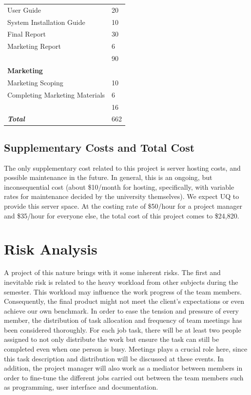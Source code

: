 \documentclass[12pt]{article}
\begin{document}
\begin{longtable}{|l|l|}
    User Guide                           & 20            \\
    System Installation Guide            & 10            \\
    Final Report                         & 30            \\
    Marketing Report                     & 6             \\
    \hline
    ~                                    & 90            \\
    \hline
    {\bf Marketing}                      & ~             \\
    Marketing Scoping                    & 10            \\
    Completing Marketing Materials       & 6             \\
    \hline
    ~                                    & 16            \\
    \hline\hline
    {\bf \em Total}                      & 662           \\
    \hline
\end{longtable}

\subsection*{Supplementary Costs and Total Cost}

The only supplementary cost related to this project is server hosting costs, and possible maintenance in the future. In general, this is an ongoing, but inconsequential cost (about \$10/month for hosting, specifically, with variable rates for maintenance decided by the university themselves). We expect UQ to provide this server space. At the costing rate of \$50/hour for a project manager and \$35/hour for everyone else, the total cost of this project comes to \$24,820.

\section*{Risk Analysis}

A project of this nature brings with it some inherent risks. The first and inevitable risk is related to the heavy workload from other subjects during the semester. This workload may influence the work progress of the team members. Consequently, the final product might not meet the client's expectations or even achieve our own benchmark. In order to ease the tension and pressure of every member, the distribution of task allocation and frequency of team meetings has been considered thoroughly. For each job task, there will be at least two people assigned to not only distribute the work but ensure the task can still be completed even when one person is busy. Meetings plays a crucial role here, since this task description and distribution will be discussed at these events. In addition, the project manager will also work as a mediator between members in order to fine-tune the different jobs carried out between the team members such as programming, user interface and documentation.
\end{document}
